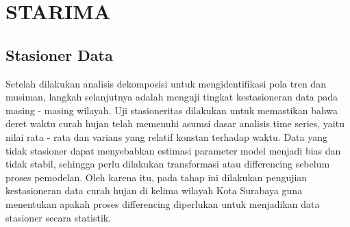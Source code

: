 \section{STARIMA}
\subsection{Stasioner Data}
\label{bab:stasioner-data-starima}
Setelah dilakukan analisis dekomposisi untuk mengidentifikasi pola tren dan musiman, langkah selanjutnya adalah menguji tingkat kestasioneran data pada masing - masing wilayah.
Uji stasioneritas dilakukan untuk memastikan bahwa deret waktu curah hujan telah memenuhi asumsi dasar analisis time series, yaitu nilai rata - rata dan varians yang relatif konstan terhadap waktu.
Data yang tidak stasioner dapat menyebabkan estimasi parameter model menjadi bias dan tidak stabil, sehingga perlu dilakukan transformasi atau differencing sebelum proses pemodelan.
Oleh karena itu, pada tahap ini dilakukan pengujian kestasioneran data curah hujan di kelima wilayah Kota Surabaya guna menentukan apakah proses differencing diperlukan untuk menjadikan data stasioner secara statistik.
